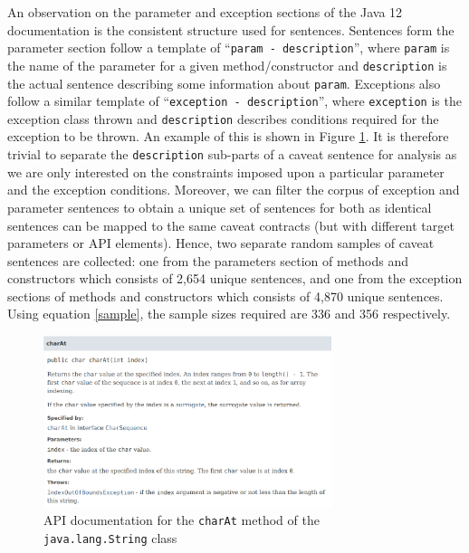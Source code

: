 An observation on the parameter and exception sections of the Java 12 documentation is the consistent structure used for sentences. Sentences form the parameter section follow a template of ``\verb|param - description|'', where \verb|param| is the name of the parameter for a given method/constructor and \verb|description| is the actual sentence describing some information about \verb|param|. Exceptions also follow a similar template of ``\verb|exception - description|'', where \verb|exception| is the exception class thrown and \verb|description| describes conditions required for the exception to be thrown. An example of this is shown in Figure \ref{fig:api-doc-charAt}. It is therefore trivial to separate the \verb|description| sub-parts of a caveat sentence for analysis as we are only interested on the constraints imposed upon a particular parameter and the exception conditions. Moreover, we can filter the corpus of exception and parameter sentences to obtain a unique set of sentences for both as identical sentences can be mapped to the same caveat contracts (but with different target parameters or API elements). Hence, two separate random samples of caveat sentences are collected: one from the parameters section of methods and constructors which consists of 2,654 unique sentences, and one from the exception sections of methods and constructors which consists of 4,870 unique sentences. Using equation \ref{sample}, the sample sizes required are 336 and 356 respectively. \\

\begin{figure}
	\label{fig:api-doc-charAt}
	\centering
	\includegraphics[width=0.75\textwidth]{figs/api-doc-charAt.png}
	\caption{API documentation for the \lstinline{charAt} method of the \lstinline{java.lang.String} class}
\end{figure}

